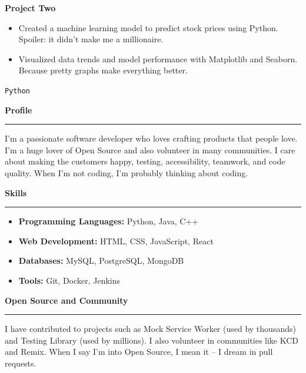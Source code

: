 \documentclass[a4paper,11pt]{article}
\newcommand{\sectiontitle}[1]{\textbf{\Large #1}\par\vspace{-1em}\noindent\rule{\linewidth}{0.3mm}\par\vspace{0.3em}}
\begin{document}
\begin{multicols}{2}
	\textbf{\large Project Two}
	\begin{itemize}
		\item Created a machine learning model to predict stock prices using Python. Spoiler: it didn’t make me a millionaire.
		\item Visualized data trends and model performance with Matplotlib and Seaborn. Because pretty graphs make everything better.
	\end{itemize}
    \texttt{Python}

	\vfill\null
	\columnbreak

	\sectiontitle{Profile}
	I'm a passionate software developer who loves crafting products that people love. I'm a huge lover of Open Source and also volunteer in many communities. I care about making the customers happy, testing, accessibility, teamwork, and code quality. When I'm not coding, I'm probably thinking about coding.

	\vspace{1em}

	\sectiontitle{Skills}
	\begin{itemize}
		\item \textbf{Programming Languages:} Python, Java, C++
		\item \textbf{Web Development:} HTML, CSS, JavaScript, React
		\item \textbf{Databases:} MySQL, PostgreSQL, MongoDB
		\item \textbf{Tools:} Git, Docker, Jenkins
	\end{itemize}

	\vspace{1em}

	\sectiontitle{Open Source and Community}
	I have contributed to projects such as Mock Service Worker (used by thousands) and Testing Library (used by millions). I also volunteer in communities like KCD and Remix. When I say I’m into Open Source, I mean it – I dream in pull requests.

\end{multicols}
\end{document}
